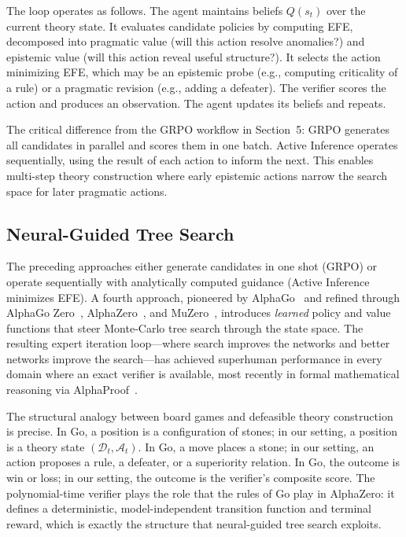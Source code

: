 \documentclass[11pt]{article}
\newcommand{\D}{\mathcal{D}}
\begin{document}
The loop operates as follows. The agent maintains beliefs $Q(s_t)$ over the current theory state. It evaluates candidate policies by computing EFE, decomposed into pragmatic value (will this action resolve anomalies?) and epistemic value (will this action reveal useful structure?). It selects the action minimizing EFE, which may be an epistemic probe (e.g., computing criticality of a rule) or a pragmatic revision (e.g., adding a defeater). The verifier scores the action and produces an observation. The agent updates its beliefs and repeats.

The critical difference from the GRPO workflow in Section~5: GRPO generates all candidates in parallel and scores them in one batch. Active Inference operates sequentially, using the result of each action to inform the next. This enables multi-step theory construction where early epistemic actions narrow the search space for later pragmatic actions.

\subsection{Neural-Guided Tree Search}

The preceding approaches either generate candidates in one shot (GRPO) or operate sequentially with analytically computed guidance (Active Inference minimizes EFE). A fourth approach, pioneered by AlphaGo~\cite{silver2016alphago} and refined through AlphaGo Zero~\cite{silver2017alphagozero}, AlphaZero~\cite{silver2018alphazero}, and MuZero~\cite{schrittwieser2020muzero}, introduces \emph{learned} policy and value functions that steer Monte-Carlo tree search through the state space. The resulting expert iteration loop---where search improves the networks and better networks improve the search---has achieved superhuman performance in every domain where an exact verifier is available, most recently in formal mathematical reasoning via AlphaProof~\cite{alphaproof2025}.

The structural analogy between board games and defeasible theory construction is precise. In Go, a position is a configuration of stones; in our setting, a position is a theory state $(\D_t, \mathcal{A}_t)$. In Go, a move places a stone; in our setting, an action proposes a rule, a defeater, or a superiority relation. In Go, the outcome is win or loss; in our setting, the outcome is the verifier's composite score. The polynomial-time verifier plays the role that the rules of Go play in AlphaZero: it defines a deterministic, model-independent transition function and terminal reward, which is exactly the structure that neural-guided tree search exploits.
\end{document}
